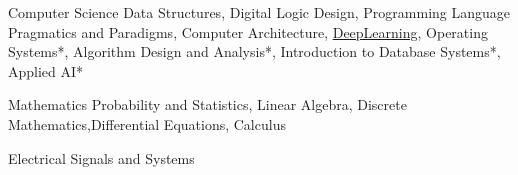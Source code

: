 

\begin{cvskills}

  \cvskill
    {Computer Science} %
    {Data Structures, Digital Logic Design, Programming Language Pragmatics and Paradigms, Computer Architecture, {\href{https://www.coursera.org/specializations/deep-learning}{Deep\newline Learning}}, Operating Systems*, Algorithm Design and Analysis*, Introduction to Database Systems*, Applied AI*} %


  \cvskill
    {Mathematics} %
    {Probability and Statistics, Linear Algebra, Discrete Mathematics,Differential Equations, Calculus} %




\cvskill
{Electrical} %
{Signals and Systems} %


\end{cvskills}
